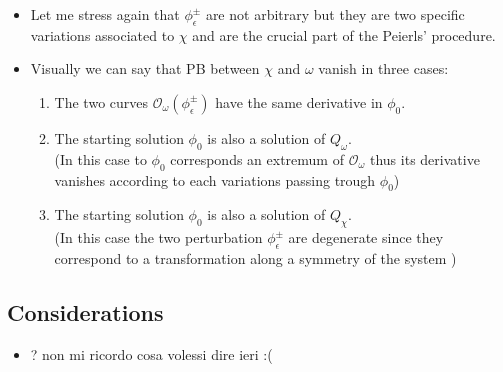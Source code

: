 \documentclass[a4paper,11pt]{scrartcl}
\begin{document}
\begin{itemize}
		\item Let me stress again that $ \phi_\epsilon^\pm$ are not arbitrary but they are two specific variations associated to $\chi$ and are the crucial part of the Peierls' procedure.
		\item Visually we can say that PB between $\chi$ and $\omega$ vanish in three cases:
		\begin{enumerate}
			\item The two curves $\mathcal{O}_\omega ( \phi_\epsilon^\pm)$ have the same derivative in $\phi_0$.
			\item The starting solution $\phi_0$ is also a solution of $Q_\omega$.\\
				(In this case to $\phi_0$ corresponds an extremum of $\mathcal{O}_\omega$ thus its derivative vanishes according to each variations passing trough $\phi_0$)
			\item The starting solution $\phi_0$ is also a solution of $Q_\chi$.\\
				(In this case the two perturbation $\phi_\epsilon^\pm$ are degenerate since they correspond to a transformation along a symmetry of the system )
		\end{enumerate}

	\end{itemize}
	\subsection{Considerations}
	\begin{itemize}
	\item ? non mi ricordo cosa volessi dire ieri :(
	\end{itemize}
	\newpage
\end{document}
